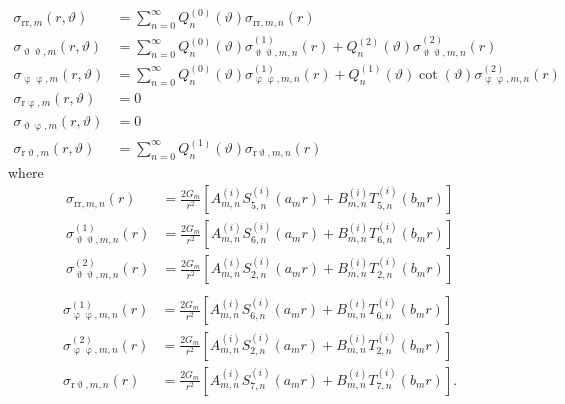 \begin{align}
	\sigma_{\mathrm{rr},m}(r,\vartheta) &= \sum_{n=0}^\infty Q_n^{(0)}(\vartheta)\sigma_{\mathrm{rr},m,n}(r)\label{Eq1:sigma_rr}\\
	\sigma_{\upvartheta\upvartheta,m}(r,\vartheta) &= \sum_{n=0}^\infty Q_n^{(0)}(\vartheta)\sigma_{\upvartheta\upvartheta,m,n}^{(1)}(r) + Q_n^{(2)}(\vartheta)\sigma_{\upvartheta\upvartheta,m,n}^{(2)}(r)\\
	\sigma_{\upvarphi\upvarphi,m}(r,\vartheta) &= \sum_{n=0}^\infty Q_n^{(0)}(\vartheta)\sigma_{\upvarphi\upvarphi,m,n}^{(1)}(r) +  Q_n^{(1)}(\vartheta)\cot(\vartheta)\sigma_{\upvarphi\upvarphi,m,n}^{(2)}(r)\\
	\sigma_{\mathrm{r}\upvarphi,m}(r,\vartheta) &= 0\\
	\sigma_{\upvartheta\upvarphi,m}(r,\vartheta) &= 0\\
	\sigma_{\mathrm{r}\upvartheta,m}(r,\vartheta) &= \sum_{n=0}^\infty Q_n^{(1)}(\vartheta)\sigma_{\mathrm{r}\upvartheta,m,n}(r)\label{Eq1:sigma_rt}
\end{align}
where
\begin{align*}
	\sigma_{\mathrm{rr},m,n}(r) &= \frac{2G_m}{r^2}\left[A_{m,n}^{(i)} S_{5,n}^{(i)}(a_m r) + B_{m,n}^{(i)} T_{5,n}^{(i)}(b_m r)\right]\\
	\sigma_{\upvartheta\upvartheta,m,n}^{(1)}(r) &= \frac{2G_m}{r^2}\left[A_{m,n}^{(i)} S_{6,n}^{(i)}(a_m r) + B_{m,n}^{(i)} T_{6,n}^{(i)}(b_m r)\right]\\
	\sigma_{\upvartheta\upvartheta,m,n}^{(2)}(r) &= \frac{2G_m}{r^2}\left[A_{m,n}^{(i)} S_{2,n}^{(i)}(a_m r) + B_{m,n}^{(i)} T_{2,n}^{(i)}(b_m r)\right]\\ 
\end{align*}
\begin{align*}
	\sigma_{\upvarphi\upvarphi,m,n}^{(1)}(r) &= \frac{2G_m}{r^2}\left[A_{m,n}^{(i)} S_{6,n}^{(i)}(a_m r) + B_{m,n}^{(i)} T_{6,n}^{(i)}(b_m r)\right]\\
	\sigma_{\upvarphi\upvarphi,m,n}^{(2)}(r) &= \frac{2G_m}{r^2}\left[A_{m,n}^{(i)} S_{2,n}^{(i)}(a_m r) + B_{m,n}^{(i)} T_{2,n}^{(i)}(b_m r)\right]\\ 
	\sigma_{\mathrm{r}\upvartheta,m,n}(r) &= \frac{2G_m}{r^2}\left[A_{m,n}^{(i)} S_{7,n}^{(i)}(a_m r) + B_{m,n}^{(i)} T_{7,n}^{(i)}(b_m r)\right].
\end{align*}

